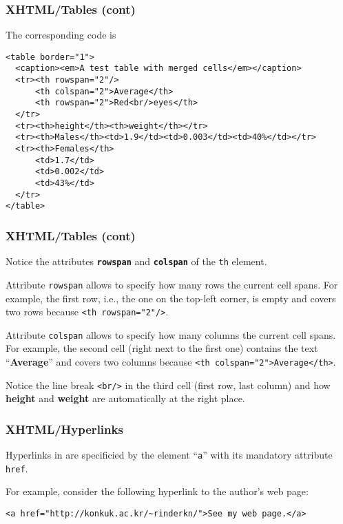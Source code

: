 %
\begin{frame}[containsverbatim]
\frametitle{XHTML/Tables (cont)}

The corresponding \HTML code is
{\small
\begin{verbatim}
<table border="1">
  <caption><em>A test table with merged cells</em></caption>
  <tr><th rowspan="2"/>
      <th colspan="2">Average</th>
      <th rowspan="2">Red<br/>eyes</th>
  </tr>
  <tr><th>height</th><th>weight</th></tr>
  <tr><th>Males</th><td>1.9</td><td>0.003</td><td>40%</td></tr>
  <tr><th>Females</th>
      <td>1.7</td>
      <td>0.002</td>
      <td>43%</td>
  </tr>
</table>
\end{verbatim}
}

\end{frame}

%
\begin{frame}[containsverbatim]
\frametitle{XHTML/Tables (cont)}

Notice the attributes \texttt{\textbf{rowspan}} and
\textbf{\texttt{colspan}} of the \texttt{th} element.

\bigskip

Attribute \texttt{rowspan} allows to specify how many rows the current
cell spans. For example, the first row, i.e., the one on the
top-left corner, is empty and covers two rows because
\verb|<th rowspan="2"/>|.

\bigskip

Attribute \texttt{colspan} allows to specify how many columns the
current cell spans. For example, the second cell (right next to the
first one) contains the text ``\textbf{Average}'' and covers two
columns because \verb|<th colspan="2">Average</th>|.

\bigskip

Notice the line break \verb|<br/>| in the third cell (first row, last
column) and how \textbf{height} and \textbf{weight} are automatically
at the right place.

\end{frame}

%
\begin{frame}[containsverbatim]
\frametitle{XHTML/Hyperlinks}

Hyperlinks in \XHTML are specificied by the element ``\texttt{a}''
with its mandatory attribute \texttt{href}. 

\bigskip

For example, consider the following hyperlink to the author's web
page:
{\small
\begin{verbatim}
<a href="http://konkuk.ac.kr/~rinderkn/">See my web page.</a>
\end{verbatim}
}

\end{frame}


